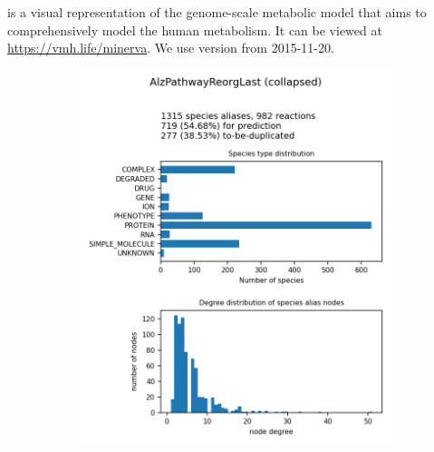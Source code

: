 \documentclass[
	fontsize=10pt, %
	twoside=false, %
	secnumdepth=1, %
  toc=indentunnumbered %
]{kaobook}
\begin{document}
\cite{noronha_ReconMapInteractiveVisualization_2017}
is a visual representation of the genome-scale metabolic model
 \cite{thiele_CommunitydrivenGlobalReconstruction_2013} that aims
to comprehensively model the human metabolism. It can be viewed at \url{https://vmh.life/minerva}.
We use version  from 2015-11-20.

\begin{figure}[h]
  \centering
  \begin{subfigure}{0.32\textwidth}
    \includegraphics[width=\linewidth]{generated/AlzPathwayReorgLast.png}
  \end{subfigure} 
  \begin{subfigure}{0.32\textwidth}

\end{subfigure}
\end{figure}
\end{document}
